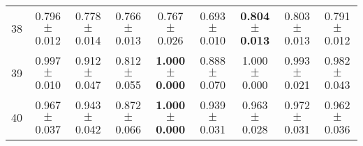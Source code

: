 \begin{table}[!ht]
{\begin{tabular}{r c c c c c c c c}
38 & 0.796 $\pm$ 0.012 & 0.778 $\pm$ 0.014 & 0.766 $\pm$ 0.013 & 0.767 $\pm$ 0.026 & 0.693 $\pm$ 0.010 & \textbf{0.804 $\pm$ 0.013} & 0.803 $\pm$ 0.013 & 0.791 $\pm$ 0.012 \\
39 & 0.997 $\pm$ 0.010 & 0.912 $\pm$ 0.047 & 0.812 $\pm$ 0.055 & \textbf{1.000 $\pm$ 0.000} & 0.888 $\pm$ 0.070 & 1.000 $\pm$ 0.000 & 0.993 $\pm$ 0.021 & 0.982 $\pm$ 0.043 \\
40 & 0.967 $\pm$ 0.037 & 0.943 $\pm$ 0.042 & 0.872 $\pm$ 0.066 & \textbf{1.000 $\pm$ 0.000} & 0.939 $\pm$ 0.031 & 0.963 $\pm$ 0.028 & 0.972 $\pm$ 0.031 & 0.962 $\pm$ 0.036 \\
\end{tabular}}
\end{table}
